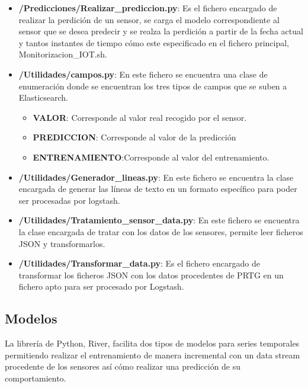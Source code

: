 \begin{itemize}
    \item \textbf{/Predicciones/Realizar\_prediccion.py}: Es el fichero encargado de realizar la perdición de un sensor, se carga el modelo correspondiente al sensor que se desea predecir y se realza la perdición a partir de la fecha actual y tantos instantes de tiempo cómo este especificado en el fichero principal, Monitorizacion\_IOT.sh.
    
    \item \textbf{/Utilidades/campos.py}: En este fichero se encuentra una clase de enumeración donde se encuentran los tres tipos de campos que se suben a Elasticsearch.
    \begin{itemize}
        \item \textbf{VALOR}: Corresponde al valor real recogido por el sensor.

        \item \textbf{PREDICCION}: Corresponde al valor de la predicción 
        \item \textbf{ENTRENAMIENTO}:Corresponde al valor del entrenamiento.
    \end{itemize}
    
    \item \textbf{/Utilidades/Generador\_lineas.py}: En este fichero se encuentra la clase encargada de generar las líneas de texto en un formato específico para poder ser procesadas por logstash. 
    
    \item \textbf{/Utilidades/Tratamiento\_sensor\_data.py}: En este fichero se encuentra la clase encargada de tratar con los datos de los sensores, permite leer ficheros JSON y transformarlos.
    
    \item \textbf{/Utilidades/Transformar\_data.py}: Es el fichero encargado de transformar los ficheros JSON con los datos procedentes de PRTG en un fichero apto para ser procesado por Logstash. 
    
\end{itemize}

\subsection{Modelos}

La librería de Python, River, facilita dos tipos de modelos para series temporales permitiendo realizar el entrenamiento de manera incremental con un data stream procedente de los sensores así cómo realizar una predicción de su comportamiento.


